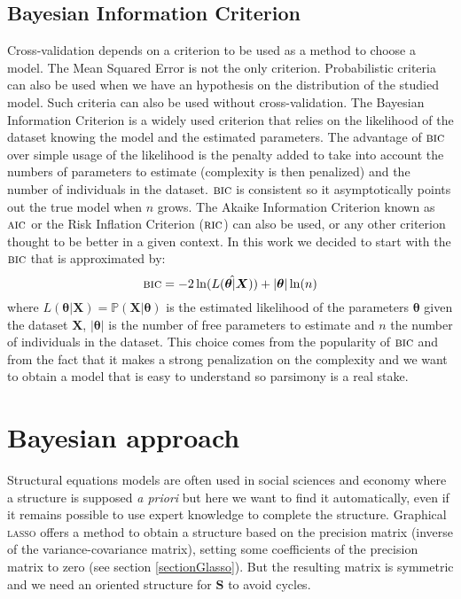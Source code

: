 \documentclass[12pt,a4paper]{report}
\begin{document}
			\subsection{ Bayesian Information Criterion}
			Cross-validation depends on a criterion to be used as a method to choose a model. The Mean Squared Error is not the only criterion. Probabilistic criteria can also be used when we have an hypothesis on the distribution of the studied model. Such criteria can also be used without cross-validation.
			The Bayesian Information Criterion \cite{BIChuard,schwarz1978estimating} is a widely used criterion that relies on the likelihood of the dataset knowing the model and the estimated parameters. The advantage of $\mbox{{\sc bic}}$ over simple usage of the likelihood is the penalty added to take into account the numbers of parameters to estimate (complexity is then penalized) and the number of individuals in the dataset. $\mbox{{\sc bic}}$ is consistent so it asymptotically points out the true model when $n$ grows. The Akaike Information Criterion \cite{akaike1974new} known as $\mbox{{\sc aic}}$ or the Risk Inflation Criterion \cite{foster1994risk} ($\mbox{{\sc ric}}$) can also be used, or any other criterion \cite{george1993variable} thought to be better in a given context.
			In this work we decided to start with the $\mbox{{\sc bic}}$ that is approximated by:
			\begin{equation}
				\mbox{{\sc bic}}=-2\ln(\hat{L(\boldsymbol{\theta}|\boldsymbol{X})})+|\boldsymbol{\theta}|\ln(n)
			\end{equation}
			where $L(\boldsymbol{\theta}|\boldsymbol{X})=\mathbb{P}(\boldsymbol{X}|\boldsymbol{\theta})$ is the estimated likelihood of the parameters $\boldsymbol{\theta}$ given the dataset $\boldsymbol{X}$, $|\boldsymbol{\theta}|$ is the number of free parameters to estimate and $n$ the number of individuals in the dataset. This choice comes from the popularity of $\mbox{{\sc bic}}$ and from the fact that it makes a strong penalization on the complexity and we want to obtain a model that is easy to understand so parsimony is a real stake.
			


\section{Bayesian approach}
Structural equations models are often used in social sciences and economy where a structure is supposed {\it a priori} but here we want to find it automatically, even if it remains possible to use expert knowledge to complete the structure. Graphical \textsc{lasso} offers a method \cite{friedman2008sparse} to obtain a structure based on the precision matrix (inverse of the variance-covariance matrix), setting some coefficients of the precision matrix to zero (see section \ref{sectionGlasso}). But the resulting matrix is symmetric and we need an oriented structure for $\boldsymbol{S}$ to avoid cycles.
\end{document}
